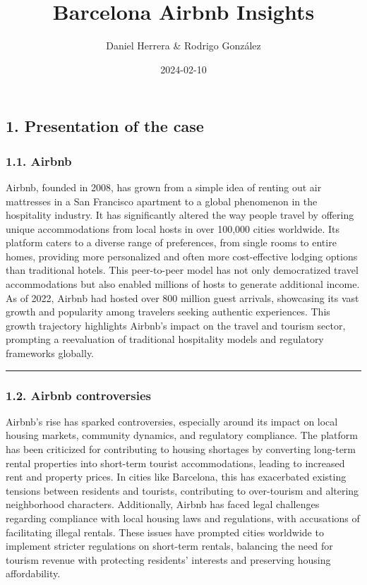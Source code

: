 \documentclass[
]{article}
\title{Barcelona Airbnb Insights}
\author{Daniel Herrera \& Rodrigo González}
\date{2024-02-10}
\begin{document}
\maketitle

\hypertarget{presentation-of-the-case}{%
\subsection{1. Presentation of the
case}\label{presentation-of-the-case}}



\hypertarget{airbnb}{%
\subsubsection{1.1. Airbnb}\label{airbnb}}

Airbnb, founded in 2008, has grown from a simple idea of renting out air
mattresses in a San Francisco apartment to a global phenomenon in the
hospitality industry. It has significantly altered the way people travel
by offering unique accommodations from local hosts in over 100,000
cities worldwide. Its platform caters to a diverse range of preferences,
from single rooms to entire homes, providing more personalized and often
more cost-effective lodging options than traditional hotels. This
peer-to-peer model has not only democratized travel accommodations but
also enabled millions of hosts to generate additional income. As of
2022, Airbnb had hosted over 800 million guest arrivals, showcasing its
vast growth and popularity among travelers seeking authentic
experiences. This growth trajectory highlights Airbnb's impact on the
travel and tourism sector, prompting a reevaluation of traditional
hospitality models and regulatory frameworks globally.

\begin{center}\rule{0.5\linewidth}{0.5pt}\end{center}

\hypertarget{airbnb-controversies}{%
\subsubsection{1.2. Airbnb controversies}\label{airbnb-controversies}}

Airbnb's rise has sparked controversies, especially around its impact on
local housing markets, community dynamics, and regulatory compliance.
The platform has been criticized for contributing to housing shortages
by converting long-term rental properties into short-term tourist
accommodations, leading to increased rent and property prices. In cities
like Barcelona, this has exacerbated existing tensions between residents
and tourists, contributing to over-tourism and altering neighborhood
characters. Additionally, Airbnb has faced legal challenges regarding
compliance with local housing laws and regulations, with accusations of
facilitating illegal rentals. These issues have prompted cities
worldwide to implement stricter regulations on short-term rentals,
balancing the need for tourism revenue with protecting residents'
interests and preserving housing affordability.
\end{document}
